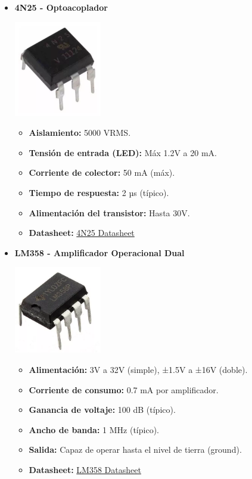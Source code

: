 \begin{itemize}
    \item \textbf{4N25 - Optoacoplador} 
    \begin{center}
        \includegraphics[width=0.3\textwidth]{Imagenes/4N25 component.png}
    \end{center}
    \begin{itemize}
        \item \textbf{Aislamiento:} 5000 VRMS.
        \item \textbf{Tensión de entrada (LED):} Máx 1.2V a 20 mA.
        \item \textbf{Corriente de colector:} 50 mA (máx).
        \item \textbf{Tiempo de respuesta:} 2 µs (típico).
        \item \textbf{Alimentación del transistor:} Hasta 30V.
        \item \textbf{Datasheet:} \href{https://www.vishay.com/docs/83725/4n25.pdf}{4N25 Datasheet}
    \end{itemize}

    \item \textbf{LM358 - Amplificador Operacional Dual} 
    \begin{center}
        \includegraphics[width=0.3\textwidth]{Imagenes/LM358.png}
    \end{center}
    \begin{itemize}
        \item \textbf{Alimentación:} 3V a 32V (simple), ±1.5V a ±16V (doble).
        \item \textbf{Corriente de consumo:} 0.7 mA por amplificador.
        \item \textbf{Ganancia de voltaje:} 100 dB (típico).
        \item \textbf{Ancho de banda:} 1 MHz (típico).
        \item \textbf{Salida:} Capaz de operar hasta el nivel de tierra (ground).
        \item \textbf{Datasheet:} \href{https://www.ti.com/lit/ds/symlink/lm358.pdf}{LM358 Datasheet}
    \end{itemize}


\end{itemize}
